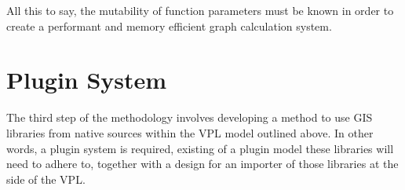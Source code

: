 All this to say, the mutability of function parameters must be known in order to create a performant and memory efficient graph calculation system.  







\section{Plugin System} 
\label{sec:method:plugin-system}

The third step of the methodology involves developing a method to use GIS libraries from native sources within the VPL model outlined above. 
In other words, a plugin system is required, existing of a plugin model these libraries will need to adhere to, together with a design for an importer of those libraries at the side of the VPL. 

